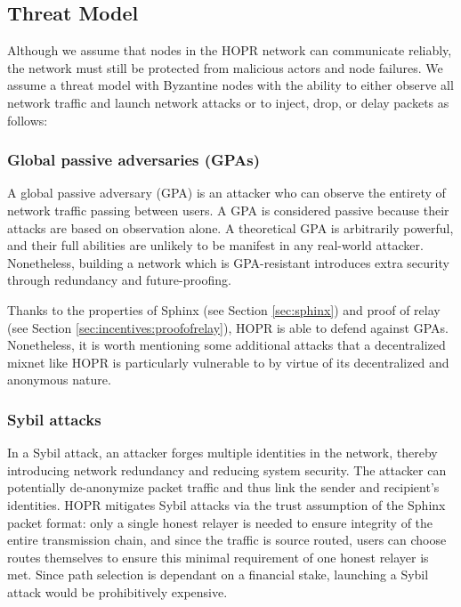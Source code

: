 \subsection{Threat Model}
\label{sec:intro:threatmodel}

Although we assume that nodes in the HOPR network can communicate reliably, the network must still be protected from malicious actors and node failures. We assume a threat model with Byzantine nodes with the ability to either observe all network traffic and launch network attacks or to inject, drop, or delay packets as follows:

\subsubsection{Global passive adversaries (GPAs)} A global passive adversary (GPA) is an attacker who can observe the entirety of network traffic passing between users. A GPA is considered passive because their attacks are based on observation alone. A theoretical GPA is arbitrarily powerful, and their full abilities are unlikely to be manifest in any real-world attacker. Nonetheless, building a network which is GPA-resistant introduces extra security through redundancy and future-proofing.

Thanks to the properties of Sphinx (see Section \ref{sec:sphinx}) and proof of relay (see Section \ref{sec:incentives:proofofrelay}), HOPR is able to defend against GPAs. Nonetheless, it is worth mentioning some additional attacks that a decentralized mixnet like HOPR is particularly vulnerable to by virtue of its decentralized and anonymous nature.

\subsubsection{Sybil attacks}
In a Sybil attack, an attacker forges multiple identities in the network, thereby introducing network redundancy and reducing system security. The attacker can potentially de-anonymize packet traffic and thus link the sender and recipient's identities. HOPR mitigates Sybil attacks via the trust assumption of the Sphinx packet format: only a single honest relayer is needed to ensure integrity of the entire transmission chain, and since the traffic is source routed, users can choose routes themselves to ensure this minimal requirement of one honest relayer is met. Since path selection is dependant on a financial stake, launching a Sybil attack would be prohibitively expensive.

